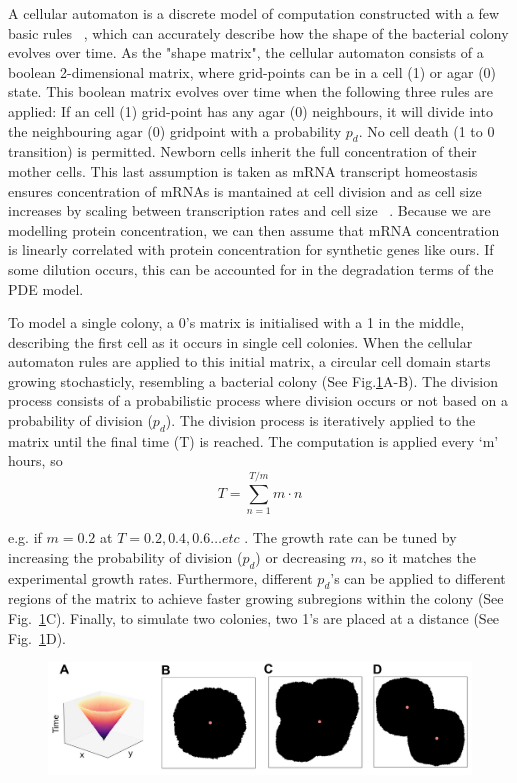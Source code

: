 A cellular automaton is a discrete model of computation constructed with a few basic rules ~\parencite{gardner1970mathematical}, which can accurately describe how the shape of the bacterial colony evolves over time.
As the "shape matrix", the cellular automaton consists of a boolean 2-dimensional matrix, where grid-points can be in a cell (1) or agar (0) state.
This boolean matrix evolves over time when the following three rules are applied: If an cell (1) grid-point has any agar (0) neighbours, it will divide into the neighbouring agar (0) gridpoint with a probability $p_{d}$.
No cell death (1 to 0 transition) is permitted.
Newborn cells inherit the full concentration of their mother cells.
This last assumption is taken as mRNA transcript homeostasis ensures concentration of mRNAs is mantained at cell division and as cell size increases by scaling between transcription rates and cell size ~\parencite{berry2022mechanisms,volteras2023global}.
Because we are modelling protein concentration, we can then assume that mRNA concentration is linearly correlated with protein concentration for synthetic genes like ours.
If some dilution occurs, this can be accounted for in the degradation terms of the PDE model.

To model a single colony, a 0's matrix is initialised with a 1 in the middle, describing the first cell as it occurs in single cell colonies.
When the cellular automaton rules are applied to this initial matrix, a circular cell domain starts growing stochasticly, resembling a bacterial colony (See Fig.\ref{cas}A-B).
The division process consists of a probabilistic process where division occurs or not based on a probability of division ($p_{d}$).
The division process is iteratively applied to the matrix until the final time (T) is reached.
The computation is applied every ‘m’ hours, so
\begin{equation}
        T = \sum_{n=1}^{T/m} m\cdot n
\end{equation}

e.g. if $m=0.2$ at $T=0.2, 0.4, 0.6 \ldots etc$ .
The growth rate can be tuned by increasing the probability of division ($p_d$) or decreasing $m$, so it matches the experimental growth rates. Furthermore, different $p_d$’s can be applied to different regions of the matrix to achieve faster growing subregions within the colony (See Fig.~\ref{cas}C). Finally, to simulate two colonies, two 1’s are placed at a distance (See Fig.~\ref{cas}D).

\begin{figure}[H]
    \centering

    \includegraphics[width=1\textwidth]{chapters/Chapter 3/cas}
    \caption{}
    \label{cas}
\end{figure}

